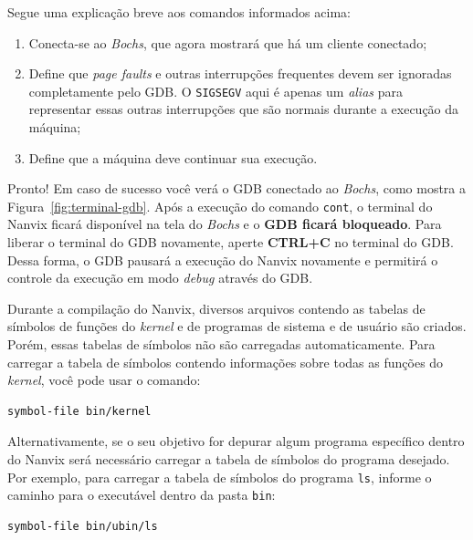 \documentclass[11pt]{article}
\begin{document}
\vspace{0.3cm}
Segue uma explicação breve aos comandos informados acima:

\begin{enumerate}
	\item Conecta-se ao \textit{Bochs}, que agora mostrará que há um cliente conectado;
	\item Define que \textit{page faults} e outras interrupções frequentes devem ser ignoradas completamente pelo GDB. O \texttt{SIGSEGV} aqui é apenas um \textit{alias} para representar essas outras interrupções que são normais durante a execução da máquina;
	\item Define que a máquina deve continuar sua execução.
\end{enumerate}

Pronto! Em caso de sucesso você verá o GDB conectado ao \textit{Bochs}, como mostra a Figura~\ref{fig:terminal-gdb}. Após a execução do comando \texttt{cont}, o terminal do Nanvix ficará disponível na tela do \textit{Bochs} e o \textbf{GDB ficará bloqueado}. Para liberar o terminal do GDB novamente, aperte \textbf{CTRL+C} no terminal do GDB. Dessa forma, o GDB pausará a execução do Nanvix novamente e permitirá o controle da execução em modo \textit{debug} através do GDB.

Durante a compilação do Nanvix, diversos arquivos contendo as tabelas de símbolos de funções do \textit{kernel} e de programas de sistema e de usuário são criados. Porém, essas tabelas de símbolos não são carregadas automaticamente. Para carregar a tabela de símbolos contendo informações sobre todas as funções do \textit{kernel}, você pode usar o comando:\\

\begin{lstlisting}[language=sh,numbers=none,frame=single]
symbol-file bin/kernel
\end{lstlisting}

\vspace{0.3cm}
Alternativamente, se o seu objetivo for depurar algum programa específico dentro do Nanvix será necessário carregar a tabela de símbolos do programa desejado. Por exemplo, para carregar a tabela de símbolos do programa \texttt{ls}, informe o caminho para o executável dentro da pasta \texttt{bin}:\\

\begin{lstlisting}[language=sh,numbers=none,frame=single]
symbol-file bin/ubin/ls
\end{lstlisting}
\end{document}

